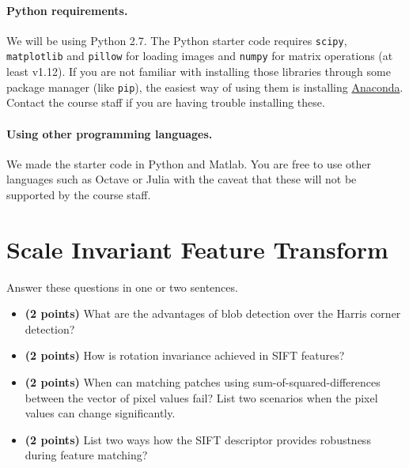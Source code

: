 \documentclass[10pt,letterpaper]{article}
\newcommand{\cmd}[1] {{\color{blue}\texttt{#1}}}
\begin{document}
\paragraph{Python requirements.} We will be using Python 2.7. The Python starter code requires \cmd{scipy}, \cmd{matplotlib} and \cmd{pillow} for loading images and \cmd{numpy} for matrix operations (at least v1.12). 
If you are not familiar with installing those libraries through some package manager (like \cmd{pip}), the easiest way of using them is installing \href{https://conda.io/docs/user-guide/install/index.html}{Anaconda}. Contact the course staff if you are having trouble installing these.

\paragraph{Using other programming languages.} We made the starter code in Python and Matlab. You are free to use other languages such as Octave or Julia with the caveat that these will not be supported by the course staff.

\newpage

\section{Scale Invariant Feature Transform}

Answer these questions in one or two sentences.
\begin{itemize}
\item \textbf{(2 points)} What are the advantages of  blob detection over the Harris corner detection?
\vspace{1.5in}

\item \textbf{(2 points)} How is rotation invariance achieved in SIFT features?
\vspace{1.5in}

\item \textbf{(2 points)} When can matching patches using sum-of-squared-differences between the vector of pixel values fail? List two scenarios when the pixel values can change significantly.
\vspace{1.5in}

\item \textbf{(2 points)} List two ways how the SIFT descriptor provides robustness during feature matching?
\vspace{1.5in}
\end{itemize}
\end{document}
